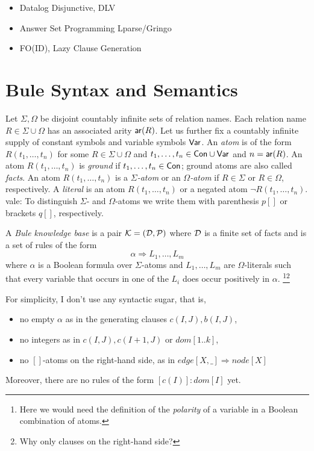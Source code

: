 \documentclass{new_tlp}
\newcommand{\vale}[1]{\textcolor[rgb]{0.00,0.00,0.54296875}{vale: #1} }
\begin{document}
\begin{itemize}
    \item Datalog Disjunctive, DLV 
    \item Answer Set Programming Lparse/Gringo
    \item FO(ID), Lazy Clause Generation
\end{itemize}



\section{Bule Syntax and Semantics}

Let $\Sigma,\Omega$ be disjoint countably infinite sets of relation names. 
Each relation name $R\in \Sigma\cup\Omega$ has an associated arity $\mathsf{ar}(R)$. 
Let us further fix a countably infinite supply of constant symbols  and variable symbols $\mathsf{Var}$. 
An
\emph{atom} is of the form $R(t_1,\ldots,t_n)$ for some $R\in
\Sigma\cup\Omega$ and $t_1,\ldots,t_n\in\mathsf{Con}\cup\mathsf{Var}$ and
$n=\mathsf{ar}(R)$. 
An atom $R(t_1,\ldots,t_n)$ is \emph{ground} if $t_1,\ldots,t_n\in\mathsf{Con}$; ground atoms are also called \emph{facts}. An atom $R(t_1,\ldots,t_n)$ is a \emph{$\Sigma$-atom} or an \emph{$\Omega$-atom} if $R\in \Sigma$ or $R\in \Omega$, respectively. 
A \emph{literal} is an atom $R(t_1,\ldots,t_n)$ or a negated atom $\neg R(t_1,\ldots,t_n)$. 
\vale{To distinguish $\Sigma$- and $\Omega$-atoms we write them with parenthesis $p[]$ or brackets $q[]$, respectively. }

A \emph{Bule knowledge base} is a pair $\mathcal{K}=(\mathcal{D},\mathcal{P})$ where $\mathcal{D}$ is a finite set of facts and \Pmc is a set of rules of the form 
%
\[\alpha \Rightarrow L_1,\ldots,L_m\]
%
where $\alpha$ is a Boolean formula over $\Sigma$-atoms and $L_1,\ldots,L_m$ are $\Omega$-literals such that every variable that occurs in one of the $L_i$ does occur positively in $\alpha$.
\footnote{Here we would need the definition of the
  \emph{polarity} of a variable in a Boolean combination of
atoms.}\footnote{Why only clauses on the right-hand side?}
{\color{red}For simplicity, I don't use any syntactic sugar, that is,
%
\begin{itemize}

  \item no empty $\alpha$ as in the generating clauses $c(I,J),b(I,J)$,

  \item no integers as in $c(I,J),c(I+1,J)$ or $dom[1..k]$,

  \item no $[]$-atoms on the right-hand side, as in $edge[X,\_ ] \Rightarrow node[X]$

\end{itemize}
Moreover, there are no rules of the form $[c(I)]:dom[I]$ yet. 
}
\end{document}
